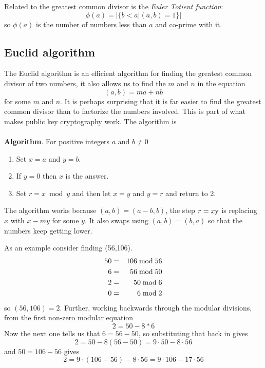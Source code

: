 \documentclass[12pt]{article}
\begin{document}
Related to the greatest common divisor is the \emph{Euler Totient function}:
\begin{equation}
\phi(a)=|\{b<a|(a,b)=1\}|
\end{equation}
so $\phi(a)$ is the number of numbers less than $a$ and co-prime with it.\HandLeft

\subsection*{Euclid algorithm}

The Euclid algorithm is an efficient algorithm for finding the
greatest common divisor of two numbers, it also allows us to find the $m$ and $n$ in the equation
\begin{equation}
(a,b)=ma+nb
\end{equation}
for some $m$ and $n$. It is perhaps surprising that it is far easier
to find the greatest common divisor than to factorize the numbers
involved. This is part of what makes public key cryptography work. The
algorithm is\\
\\
\noindent \textbf{Algorithm}. For positive integers $a$ and $b\not=0$ 
\begin{enumerate}
\item Set $x=a$ and $y=b$.
\item If $y=0$ then $x$ is the answer.
\item Set $r=x\bmod y$ and then let $x=y$ and $y=r$ and return to 2.
\end{enumerate}

The algorithm works because $(a,b)=(a-b,b)$, the step $r=x\mbox y$ is
replacing $x$ with $x-my$ for some $y$. It also swaps using
$(a,b)=(b,a)$ so that the numbers keep getting lower.

As an example consider finding (56,106). 
\begin{eqnarray}
50&=&106\bmod 56\cr
6 &=&56 \bmod 50\cr
2 &=&50 \bmod 6\cr
 0 &=&6 \bmod 2
\end{eqnarray}
so $(56,106)=2$. Further, working backwards through the modular divisions, from the first non-zero modular equation
\begin{equation}
2 =50-8*6
\end{equation}
Now the next one tells us that $6=56-50$, so substituting that back in gives
\begin{equation}
2 =50-8(56-50)=9\cdot 50 -8\cdot 56
\end{equation}
and $50=106-56$ gives
\begin{equation}
2 = 9\cdot (106-56) - 8\cdot 56 = 9\cdot 106 -17 \cdot 56
\end{equation}
\end{document}

